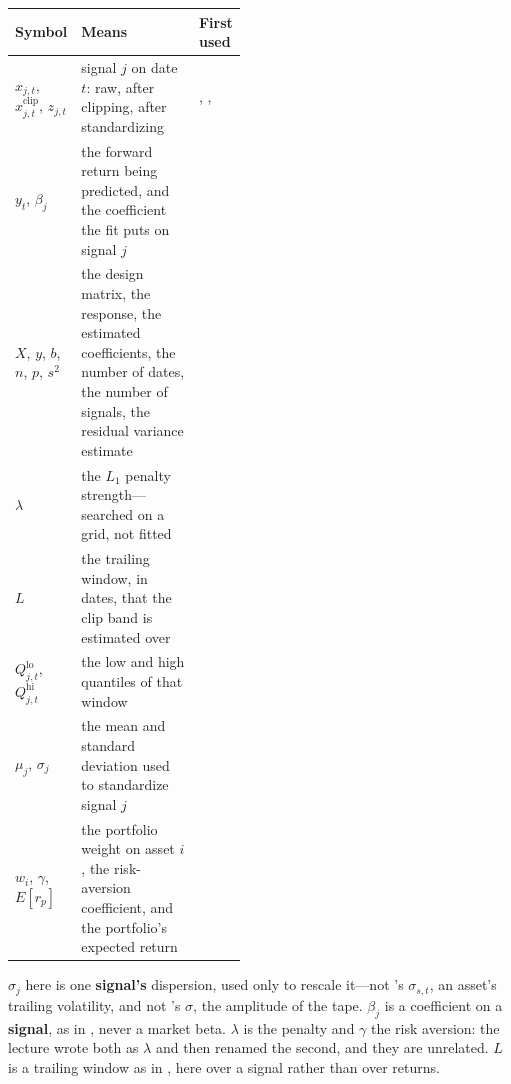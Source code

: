 \begin{xltabular}{\linewidth}{|>{\raggedright\arraybackslash}p{0.26\linewidth}|X|>{\raggedright\arraybackslash}p{0.20\linewidth}|}
\hline
\textbf{Symbol} & \textbf{Means} & \textbf{First used} \\ \hline
\endhead
$x_{j,t}$, $x^{\text{clip}}_{j,t}$, $z_{j,t}$
  & signal $j$ on date $t$: raw, after clipping, after standardizing
  & , ,  \\ \hline
$y_t$, $\beta_j$
  & the forward return being predicted, and the coefficient the fit puts on signal $j$
  &  \\ \hline
$X$, $y$, $b$, $n$, $p$, $s^2$
  & the design matrix, the response, the estimated coefficients, the number of dates, the number
    of signals, the residual variance estimate
  &  \\ \hline
$\lambda$
  & the $L_1$ penalty strength---searched on a grid, not fitted
  &  \\ \hline
$L$
  & the trailing window, in dates, that the clip band is estimated over
  &  \\ \hline
$Q^{\text{lo}}_{j,t}$, $Q^{\text{hi}}_{j,t}$
  & the low and high quantiles of that window
  &  \\ \hline
$\mu_j$, $\sigma_j$
  & the mean and standard deviation used to standardize signal $j$
  &  \\ \hline
$w_i$, $\gamma$, $E[r_p]$
  & the portfolio weight on asset $i$, the risk-aversion coefficient, and the portfolio's expected
    return
  &  \\ \hline
\end{xltabular}

\begin{note}
$\sigma_j$ here is one \textbf{signal's} dispersion, used only to rescale it---not
's $\sigma_{s,t}$, an asset's trailing volatility,
and not 's $\sigma$, the amplitude of the tape.
$\beta_j$ is a coefficient on a \textbf{signal}, as in
, never a market beta. $\lambda$ is the penalty
and $\gamma$ the risk aversion: the lecture wrote both as $\lambda$ and then renamed the second,
and they are unrelated. $L$ is a trailing window as in
, here over a signal rather than over returns.
\end{note}


